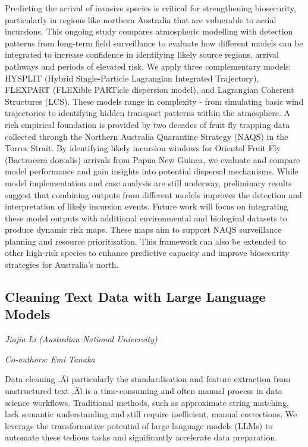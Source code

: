 \documentclass[
]{scrreprt}
\begin{document}
Predicting the arrival of invasive species is critical for strengthening
biosecurity, particularly in regions like northern Australia that are
vulnerable to aerial incursions. This ongoing study compares atmospheric
modelling with detection patterns from long-term field surveillance to
evaluate how different models can be integrated to increase confidence
in identifying likely source regions, arrival pathways and periods of
elevated risk. We apply three complementary models: HYSPLIT (Hybrid
Single-Particle Lagrangian Integrated Trajectory), FLEXPART (FLEXible
PARTicle dispersion model), and Lagrangian Coherent Structures (LCS).
These models range in complexity - from simulating basic wind
trajectories to identifying hidden transport patterns within the
atmosphere. A rich empirical foundation is provided by two decades of
fruit fly trapping data collected through the Northern Australia
Quarantine Strategy (NAQS) in the Torres Strait. By identifying likely
incursion windows for Oriental Fruit Fly (Bactrocera dorsalis) arrivals
from Papua New Guinea, we evaluate and compare model performance and
gain insights into potential dispersal mechanisms. While model
implementation and case analysis are still underway, preliminary results
suggest that combining outputs from different models improves the
detection and interpretation of likely incursion events. Future work
will focus on integrating these model outputs with additional
environmental and biological datasets to produce dynamic risk maps.
These maps aim to support NAQS surveillance planning and resource
prioritisation. This framework can also be extended to other high-risk
species to enhance predictive capacity and improve biosecurity
strategies for Australia's north.

\subsection{Cleaning Text Data with Large Language
Models}\label{cleaning-text-data-with-large-language-models}

\emph{Jiajia Li} \emph{(Australian National
University)}

\emph{Co-authors: Emi Tanaka}

\setlength{\parskip}{0.5em}

Data cleaning ‚Äì particularly the standardisation and feature
extraction from unstructured text ‚Äì is a time-consuming and often
manual process in data science workflows. Traditional methods, such as
approximate string matching, lack semantic understanding and still
require inefficient, manual corrections. We leverage the transformative
potential of large language models (LLMs) to automate these tedious
tasks and significantly accelerate data preparation.
\end{document}
